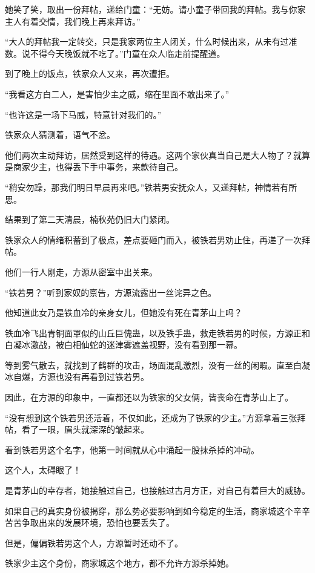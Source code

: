\begin{this_body}
她笑了笑，取出一份拜帖，递给门童：“无妨。请小童子带回我的拜帖。我与你家主人有着交情，我们晚上再来拜访。”

“大人的拜帖我一定转交，只是我家两位主人闭关，什么时候出来，从未有过准数。说不得今天晚饭就不吃了。”门童在众人临走前提醒道。

到了晚上的饭点，铁家众人又来，再次遭拒。

“我看这方白二人，是害怕少主之威，缩在里面不敢出来了。”

“也许这是一场下马威，特意针对我们的。”

铁家众人猜测着，语气不忿。

他们两次主动拜访，居然受到这样的待遇。这两个家伙真当自己是大人物了？就算是商家少主，也得丢下手中事务，来款待自己。

“稍安勿躁，那我们明日早晨再来吧。”铁若男安抚众人，又递拜帖，神情若有所思。

结果到了第二天清晨，楠秋苑仍旧大门紧闭。

铁家众人的情绪积蓄到了极点，差点要砸门而入，被铁若男劝止住，再递了一次拜帖。

他们一行人刚走，方源从密室中出关来。

“铁若男？”听到家奴的禀告，方源流露出一丝诧异之色。

他知道此女乃是铁血冷的亲身女儿，但她没有死在青茅山上吗？

铁血冷飞出青铜面罩似的山丘巨傀蛊，以及铁手蛊，救走铁若男的时候，方源正和白凝冰激战，被白相仙蛇的迷津雾遮盖视野，没有看到那一幕。

等到雾气散去，就找到了鹤群的攻击，场面混乱激烈，没有一丝的闲暇。直至白凝冰自爆，方源也没有再看到过铁若男。

因此，在方源的印象中，一直都还以为铁家的父女俩，皆丧命在青茅山上了。

“没有想到这个铁若男还活着，不仅如此，还成为了铁家的少主。”方源拿着三张拜帖，看了一眼，眉头就深深的皱起来。

看到铁若男这个名字，他第一时间就从心中涌起一股抹杀掉的冲动。

这个人，太碍眼了！

是青茅山的幸存者，她接触过自己，也接触过古月方正，对自己有着巨大的威胁。

如果自己的真实身份被揭穿，那么势必要影响到如今稳定的生活，商家城这个辛辛苦苦争取出来的发展环境，恐怕也要丢失了。

但是，偏偏铁若男这个人，方源暂时还动不了。

铁家少主这个身份，商家城这个地方，都不允许方源杀掉她。


\end{this_body}
